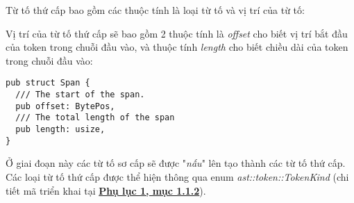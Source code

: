 Từ tố thứ cấp bao gồm các thuộc tính là loại từ tố và vị trí của từ tố:

Vị trí của từ tố thứ cấp sẽ bao gồm 2 thuộc tính là \textit{offset} cho biết vị trí bắt đầu của token trong chuỗi đầu vào, và thuộc tính \textit{length} cho biết chiều dài của token trong chuỗi đầu vào:
\begin{lstlisting}
pub struct Span {
  /// The start of the span.
  pub offset: BytePos,
  /// The total length of the span
  pub length: usize,
}
\end{lstlisting}

Ở giai đoạn này các từ tố sơ cấp sẽ được "\textit{nấu}" lên tạo thành các từ tố thứ cấp. Các loại từ tố thứ cấp được thể hiện thông qua enum \textit{ast::token::TokenKind} (chi tiết mã triển khai tại \hyperref[ap1:flex_token_kind]{\bf Phụ lục 1, mục 1.1.2}).

